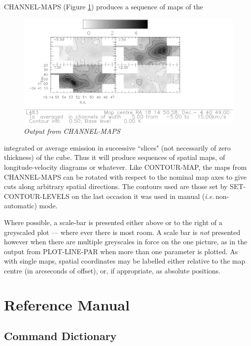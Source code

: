 \documentclass[11pt,twoside]{report}
\newcommand{\ie}{{\it i.e.\,}}
\begin{document}
CHANNEL-MAPS (Figure \ref{CHANMAP}) produces a sequence of maps of the
\begin{figure}[htbp]
\begin{center}
\includegraphics[scale=0.8]{chann-map.ps}
\protect\parbox{5.5in}
{\caption[CHANMAP]
{\sl
Output from CHANNEL-MAPS
\label{CHANMAP}
}
}
\end{center}
\end{figure}
integrated or average emission in successive ``slices" (not necessarily of zero
thickness) of the cube. Thus it will produce sequences of spatial maps, of
longitude-velocity diagrams  or whatever.
Like CONTOUR-MAP, the maps from CHANNEL-MAPS can be rotated with respect to the
nominal map axes to give cuts along arbitrary spatial directions. The contours
used are those set by SET-CONTOUR-LEVELS on the last occasion it was used in
manual (\ie non-automatic) mode. 

Where possible, a scale-bar is presented either 
above or to the right of a greyscaled plot --- where ever there is most room.
A scale bar is {\em not} presented however when there are multiple greyscales
in force on the one picture, as in the output from PLOT-LINE-PAR when more
than one parameter is plotted.
As with single maps, spatial coordinates may be labelled either relative to
the map centre (in arcseconds of offset), or, if appropriate, as absolute
positions.

\newpage
\part{Reference Manual}
\chapter{Command Dictionary}
\end{document}
